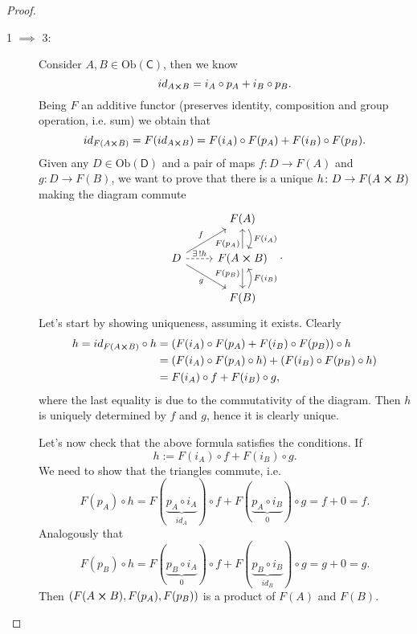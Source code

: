 \documentclass[../Main]{subfiles}
\begin{document}
\begin{proof}
\begin{description}
		\item[1 $\implies$ 3:]
			Consider $A, B \in \mathrm{Ob} \left(\mathsf{C}\right)$, then we know
			\begin{equation}
			id_{A \cross B} = i_A \circ p_A + i_B \circ p_B
			.\end{equation} 
			Being $F$ an additive functor (preserves identity, composition and
			group operation, i.e. sum) we obtain that
			\begin{equation}
				id_{F(A \cross B)} = F(id_{A \cross B}) =
				F(i_A) \circ F(p_A) + F(i_B) \circ F(p_B)
			.\end{equation} 
			Given any $D \in \mathrm{Ob} \left(\mathsf{D}\right)$
			and a pair of maps $f\colon D \to F(A)$
			and $g\colon D \to F(B)$, we want to prove
			that there is a unique $h\colon D \to F(A \cross B)$
			making the diagram commute
			\begin{equation}
			\begin{tikzcd}
				&
				F(A) \arrow[d, "F(i_A)", rightarrow, bend left] \\
				D \arrow[ru, "f", rightarrow] \arrow[rd, "g"', rightarrow] 
				\arrow[r, "\exists\, ! h", dashrightarrow] &
				F(A \cross B) \arrow[u, "F(p_A)" near start, rightarrow]
				\arrow[d, "F(p_B)"' near start, rightarrow] \\
				&
				F(B) \arrow[u, "F(i_B)"', rightarrow, bend right] 
			\end{tikzcd}
			.\end{equation} 
			Let's start by showing uniqueness, assuming it exists.
			Clearly
			\begin{align}
				h = id_{F(A \cross B)} \circ h &=
				\left( F(i_A) \circ F(p_A) + F(i_B) \circ F(p_B) \right) \circ h\\
				&=
				\left( F(i_A) \circ F(p_A) \circ h \right) + 
				\left( F(i_B) \circ F(p_B) \circ h \right) \nonumber\\
				&=
				F(i_A) \circ f + F(i_B) \circ g\nonumber
			,\end{align} 
			where the last equality is due to the commutativity of the diagram.
			Then $h$ is uniquely determined by $f$ and $g$, hence it is clearly unique.

			Let's now check that the above formula satisfies the conditions.
			If
			\begin{equation}
				h := F(i_A) \circ f + F(i_B) \circ g
			.\end{equation} 
			We need to show that the triangles commute, i.e.
			\begin{equation}
				F(p_A) \circ h = F(\underbrace{p_A \circ i_A}_{id_A}) \circ f
				+ F(\underbrace{p_A \circ i_B}_{0}) \circ g =
				f + 0 = f
			.\end{equation} 
			Analogously that
			\begin{equation}
				F(p_B) \circ h = F(\underbrace{p_B \circ i_A}_{0}) \circ f
				+ F(\underbrace{p_B \circ i_B}_{id_B}) \circ g =
				g + 0 = g
			.\end{equation} 
			Then $\left(F(A \cross B), F(p_A), F(p_B)\right)$
			is a product of $F(A)$ and $F(B)$.\qedhere
	\end{description} 
\end{proof}
\end{document}
